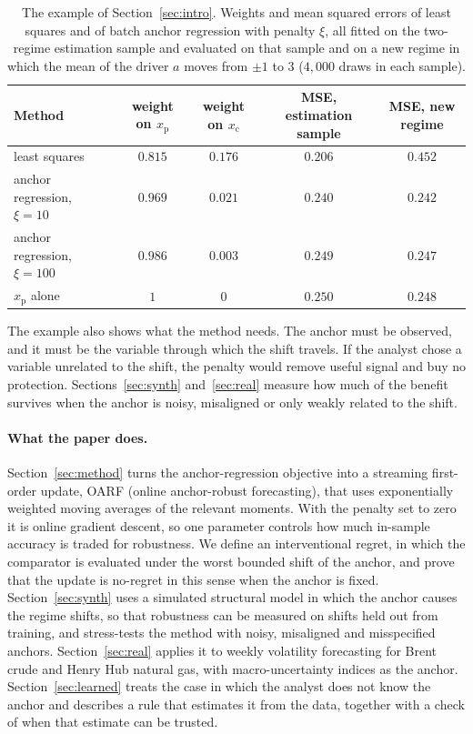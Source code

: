 \documentclass[12pt]{article}
\theoremstyle{plain}
\theoremstyle{remark}
\newcommand{\OARF}{\textsc{OARF}}
\begin{document}
\begin{table}[htbp]
\centering
\caption{The example of Section~\ref{sec:intro}. Weights and mean squared errors of
least squares and of batch anchor regression with penalty $\xi$, all fitted on the
two-regime estimation sample and evaluated on that sample and on a new regime in which
the mean of the driver $a$ moves from $\pm1$ to $3$ ($4{,}000$ draws in each sample).}
\label{tab:example}
\small
\begin{tabular}{lcccc}
\toprule
Method & weight on $x_{\mathrm p}$ & weight on $x_{\mathrm c}$ & MSE, estimation sample & MSE, new regime\\
\midrule
least squares             & $0.815$ & $0.176$ & $0.206$ & $0.452$\\
anchor regression, $\xi=10$  & $0.969$ & $0.021$ & $0.240$ & $0.242$\\
anchor regression, $\xi=100$ & $0.986$ & $0.003$ & $0.249$ & $0.247$\\
$x_{\mathrm p}$ alone     & $1$     & $0$     & $0.250$ & $0.248$\\
\bottomrule
\end{tabular}
\end{table}

The example also shows what the method needs. The anchor must be observed, and it
must be the variable through which the shift travels. If the analyst chose a variable
unrelated to the shift, the penalty would remove useful signal and buy no protection.
Sections~\ref{sec:synth} and~\ref{sec:real} measure how much of the benefit survives
when the anchor is noisy, misaligned or only weakly related to the shift.

\paragraph{What the paper does.}
Section~\ref{sec:method} turns the anchor-regression objective into a streaming
first-order update, \OARF{} (online anchor-robust forecasting), that uses
exponentially weighted moving averages of the relevant moments. With the penalty set
to zero it is online gradient descent, so one parameter controls how much in-sample
accuracy is traded for robustness. We define an interventional regret, in which the
comparator is evaluated under the worst bounded shift of the anchor, and prove that
the update is no-regret in this sense when the anchor is fixed. Section~\ref{sec:synth}
uses a simulated structural model in which the anchor causes the regime shifts, so
that robustness can be measured on shifts held out from training, and stress-tests the
method with noisy, misaligned and misspecified anchors. Section~\ref{sec:real} applies
it to weekly volatility forecasting for Brent crude and Henry Hub natural gas, with
macro-uncertainty indices as the anchor. Section~\ref{sec:learned} treats the case in
which the analyst does not know the anchor and describes a rule that estimates it from
the data, together with a check of when that estimate can be trusted.
\end{document}

